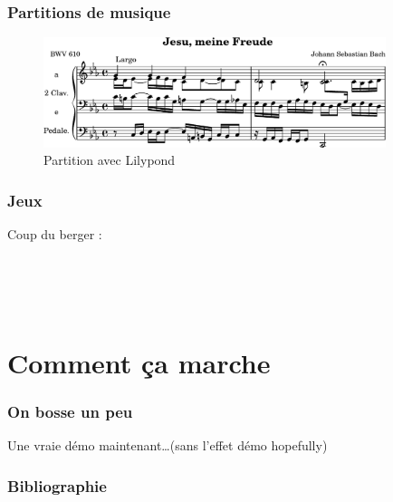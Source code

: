\documentclass{beamer}
\begin{document}
\begin{frame}
  \frametitle{Partitions de musique}
  \begin{figure}[H]
    \centering
    \includegraphics[width=10cm]{lilypond}
    \caption{Partition avec Lilypond}
    \label{fig:lilypond}
  \end{figure}
\end{frame}

\begin{frame}[fragile]
  \frametitle{Jeux}
  \newgame
  \notationoff
  \begin{multicols}{2}
    Coup du berger :
    
       \\
     \\
     \\
    \columnbreak
    \showboard
  \end{multicols}
\end{frame}

\section{Comment ça marche}

\begin{frame}
  \frametitle{On bosse un peu}
  Une vraie démo maintenant\dots (sans l'effet démo hopefully)
\end{frame}

\begin{frame}[allowframebreaks]
  \frametitle{Bibliographie}
  \nocite{texse}
  \nocite{latex}
  \nocite{lshort}
  \nocite{comprehensive}
  \nocite{newsgroup}
  \nocite{mathguide}
  \nocite{ctan}
  
  
\end{frame}
\end{document}

